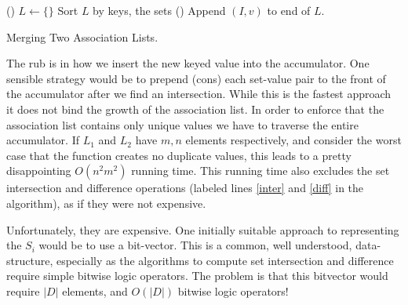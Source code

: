 \documentclass{article}
\begin{document}
\begin{algorithm}[H]
  \newcommand{\forcond}{$i=0$ \KwTo $n$}
  \DontPrintSemicolon
  \Fn(){}{
    $L \leftarrow \{\} $\;
    Sort $L$ by keys, the sets
  }
  \Fn(){}{
    Append $(I,v)$ to end of $L$.\;
  }
\caption{Merging Two Association Lists.\label{Alm1}}
\end{algorithm}

The rub is in how we insert the new keyed value into the accumulator.
One sensible strategy would be to prepend (cons) each set-value pair to the
front of the accumulator after we find an intersection.
While this is the fastest approach it does not bind the growth of the
association list.
In order to enforce that the association list contains only unique values
we have to traverse the entire accumulator.
If $L_{1}$ and $L_{2}$ have $m, n$ elements respectively,
and consider the worst case that the function creates no duplicate values,
this leads to a pretty disappointing $O(n^{2}m^{2})$ running time.
This running time also excludes the set intersection and difference
operations (labeled lines \ref{inter} and \ref{diff} in the algorithm),
as if they were not expensive.

Unfortunately, they are expensive.
One initially suitable approach to representing the $S_{i}$ would be
to use a bit-vector.
This is a common, well understood, data-structure,
especially as the algorithms to compute set intersection and difference require
simple bitwise logic operators.
The problem is that this bitvector would require $|D|$ elements,
and $O(|D|)$ bitwise logic operators!
\end{document}
